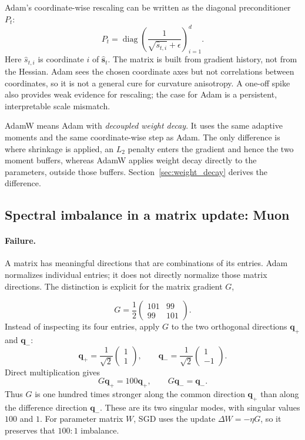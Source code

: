 \documentclass[11pt,letterpaper]{article}
\newcommand{\diag}{\operatorname{diag}}
\begin{document}
Adam's coordinate-wise rescaling can be written as the diagonal
preconditioner \(P_t\):
\begin{equation}\label{eq:adam_preconditioner}
  P_t=\diag\!\left(
    \frac{1}{\sqrt{\widehat s_{t,i}}+\epsilon}
  \right)_{i=1}^{d}.
\end{equation}
Here \(\widehat s_{t,i}\) is coordinate \(i\) of
\(\widehat{\bm s}_t\). The matrix is built from gradient history, not from
the Hessian. Adam sees
the chosen coordinate axes but not correlations between coordinates, so it is
not a general cure for curvature anisotropy. A one-off spike also provides
weak evidence for rescaling; the case for Adam is a persistent, interpretable
scale mismatch.

AdamW means Adam with \emph{decoupled weight decay}. It uses the same adaptive
moments and the same coordinate-wise step as Adam. The only difference is
where shrinkage is applied, an \(L_2\) penalty enters the gradient and hence
the two moment buffers, whereas AdamW applies weight decay directly to the
parameters, outside those buffers. Section~\ref{sec:weight_decay} derives the
difference.


\subsection{Spectral imbalance in a matrix update: Muon}

\paragraph{Failure.}
A matrix has meaningful directions that are combinations of its entries.
Adam normalizes individual entries; it does not directly normalize those
matrix directions. The distinction is explicit for the matrix gradient \(G\),

\begin{equation}\label{eq:muon_matrix_example}
  G=\frac12\begin{pmatrix}101&99\\99&101\end{pmatrix}.
\end{equation}
Instead of inspecting its four entries, apply \(G\) to the two orthogonal
directions \(\bm q_+\) and \(\bm q_-\):
\begin{equation}
  \bm q_+=\frac1{\sqrt2}\begin{pmatrix}1\\1\end{pmatrix},
  \qquad
  \bm q_-=\frac1{\sqrt2}\begin{pmatrix}1\\-1\end{pmatrix}.
\end{equation}
Direct multiplication gives
\begin{equation}
  G\bm q_+=100\bm q_+,
  \qquad
  G\bm q_-=\bm q_-.
\end{equation}
Thus \(G\) is one hundred times stronger along the common direction
\(\bm q_+\) than along the difference direction \(\bm q_-\). These are its
two singular modes, with singular values \(100\) and \(1\). For parameter
matrix \(W\), SGD uses the update \(\Delta W=-\eta G\), so it preserves that
\(100{:}1\) imbalance.
\end{document}
